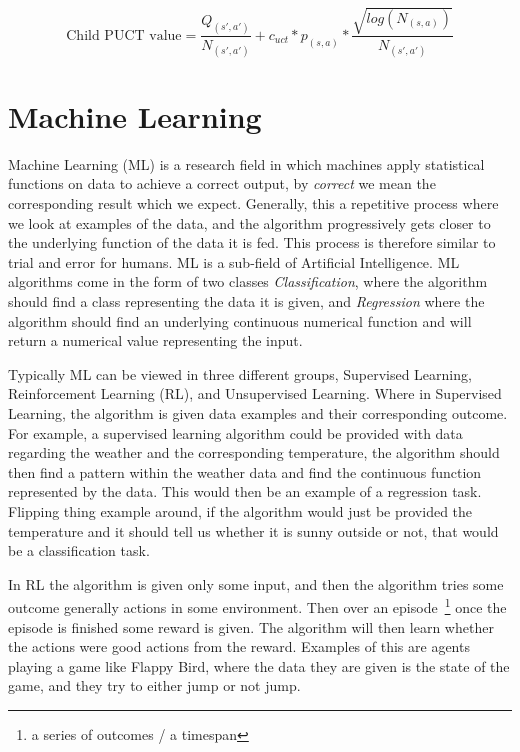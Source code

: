 \begin{equation} \label{PUCT_formula}
  \text{Child PUCT value} = \frac{Q_{(s',a')}}{N_{(s',a')}} + c_{uct} * p_{(s,a)} * \frac{\sqrt{log(N_{(s,a)})}}{N_{(s',a')}}
\end{equation}

\section{Machine Learning}

Machine Learning (ML) is a research field in which machines apply statistical functions on data to achieve a correct output, by \textit{correct} we mean the corresponding result which we expect. Generally, this a repetitive process where we look at examples of the data, and the algorithm progressively gets closer to the underlying function of the data it is fed. This process is therefore similar to trial and error for humans. ML is a sub-field of Artificial Intelligence. ML algorithms come in the form of two classes \textit{Classification}, where the algorithm should find a class representing the data it is given, and \textit{Regression} where the algorithm should find an underlying continuous numerical function and will return a numerical value representing the input.

Typically ML can be viewed in three different groups, Supervised Learning, Reinforcement Learning (RL), and Unsupervised Learning. Where in Supervised Learning, the algorithm is given data examples and their corresponding outcome. For example, a supervised learning algorithm could be provided with data regarding the weather and the corresponding temperature, the algorithm should then find a pattern within the weather data and find the continuous function represented by the data. This would then be an example of a regression task. Flipping thing example around, if the algorithm would just be provided the temperature and it should tell us whether it is sunny outside or not, that would be a classification task.

In RL the algorithm is given only some input, and then the algorithm tries some outcome generally actions in some environment. Then over an episode~\footnote{a series of outcomes / a timespan} once the episode is finished some reward is given. The algorithm will then learn whether the actions were good actions from the reward. Examples of this are agents playing a game like Flappy Bird, where the data they are given is the state of the game, and they try to either jump or not jump.

